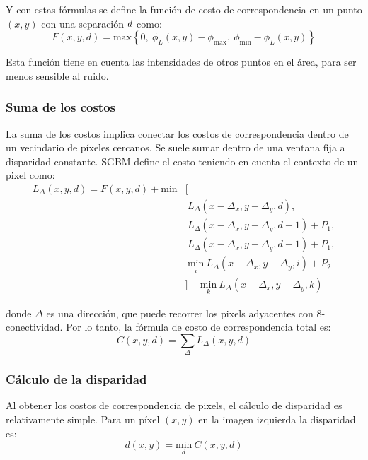 \documentclass[11pt,a4paper,titlepage]{article}
\newcommand{\Scalar}[1]{\ensuremath{\mathnormal{#1}}}
\begin{document}
Y con estas fórmulas se define la función de costo de correspondencia en un punto $(x, y)$ con una separación \Scalar{d} como:
\[
	F(x, y, d) = \mathrm{max} \left\{ 0,\ \phi_L(x, y) - \phi_\mathrm{max},\ \phi_\mathrm{min} - \phi_L(x, y) \right\}
\]

Esta función tiene en cuenta las intensidades de otros puntos en el área, para ser menos sensible al ruido.

\subsubsection{Suma de los costos}

La suma de los costos implica conectar los costos de correspondencia dentro de un vecindario de píxeles cercanos. Se suele sumar dentro de una ventana fija a disparidad constante. SGBM define el costo teniendo en cuenta el contexto de un pixel como:
\begin{align*}
	L_\Delta(x, y, d) = F(x, y, d) + \mathrm{min} & [ \\ 
	                                                              &\ L_\Delta(x - \Delta_x, y - \Delta_y, d), \\
	                                                              &\ L_\Delta(x - \Delta_x, y - \Delta_y, d - 1) + P_1,\\
	                                                              &\ L_\Delta(x - \Delta_x, y - \Delta_y, d + 1) + P_1,\\
	                                                              &\ \underset{i}{\mathrm{min}}\ L_\Delta(x - \Delta_x, y - \Delta_y, i) + P_2\\
	                                                              & ] - \underset{k}{\mathrm{min}}\ L_\Delta(x - \Delta_x, y - \Delta_y, k)
\end{align*}

donde $\Delta$ es una dirección, que puede recorrer los pixels adyacentes con 8-conectividad. Por lo tanto, la fórmula de costo de correspondencia total es:
\[
	C(x, y, d) = \sum_\Delta L_\Delta(x, y, d)
\]

\subsubsection{Cálculo de la disparidad}

Al obtener los costos de correspondencia de pixels, el cálculo de disparidad es relativamente simple. Para un píxel $(x, y)$ en la imagen izquierda la disparidad es:
\[
	d(x, y) = \underset{d}{\mathrm{min}}\ C\left( x, y, d \right)
\]
\end{document}

